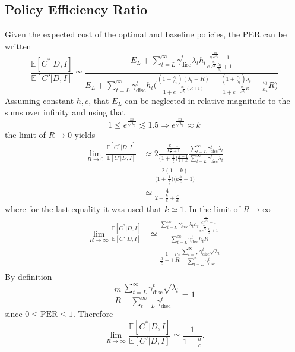 \subsection{Policy Efficiency Ratio}
Given the expected cost of the optimal and baseline policies, the PER can be written
\begin{equation}
	\frac{\mathbb{E}[C^*|D,I] }{\mathbb{E}[C'|D,I]}\simeq \frac{E_L+\sum_{t=L}^{\infty} \gamma_{\text{disc}}^{t} \lambda_th_t\frac{e^{\frac{m}{\sqrt{\lambda_t}}}-1}{e^{\frac{m}{\sqrt{\lambda_t}}}\frac{h_t}{c_t}+1}}{E_L+\sum_{t=L}^{\infty} \gamma_{\text{disc}}^{t}h_t \bigg( 
		\frac{(1+\frac{c_t}{h_t})(\lambda_t+R)}{1+e^{-\frac{m}{\sqrt{\lambda_t}}(R+1)}}- \frac{(1+\frac{c_t}{h_t})\lambda_t}{1+e^{-\frac{m}{\sqrt{\lambda_t}}R}} - \frac{c_t}{h_t}R\bigg)}
\end{equation}
Assuming constant $h,c$, that $E_L$ can be neglected in relative magnitude to the sums over infinity and using that \begin{equation}
	1\leq e^{\frac{m}{\sqrt{\lambda_t}}}\lesssim 1.5 \Rightarrow  e^{\frac{m}{\sqrt{\lambda_t}}}\approx k
\end{equation}
the limit of $R\rightarrow 0$ yields
\begin{equation}
	\begin{split}
		\lim\limits_{R\rightarrow 0}\frac{\mathbb{E}[C^*|D,I]}{\mathbb{E}[C'|D,I]} 
		&\approx 2 \frac{\frac{k-1}{k\frac{h}{c} + 1}}{\big(1 + \frac{1}{\frac{h}{c}}\big)\frac{k-1}{1+k}} \frac{\sum_{t=L}^{\infty} \gamma_{\text{disc}}^{t} \lambda_t}{\sum_{t=L}^{\infty} \gamma_{\text{disc}}^{t} \lambda_t} \\
		&= \frac{2(1+k)}{\big(1 + \frac{1}{\frac{h}{c}}\big)\big(k\frac{h}{c} + 1\big)} \\
		&\simeq \frac{4}{2 + \frac{h}{c} + \frac{c}{h}}
	\end{split}
\end{equation}
where for the last equality it was used that $k\simeq 1$. In the limit of $R\rightarrow \infty$
\begin{equation}
	\begin{split}
		\lim\limits_{R\rightarrow \infty}\frac{\mathbb{E}[C^*|D,I] }{\mathbb{E}[C'|D,I]} &\simeq \frac{\sum_{t=L}^{\infty} \gamma_{\text{disc}}^{t} \lambda_th_t\frac{e^{\frac{m}{\sqrt{\lambda_t}}}-1}{e^{\frac{m}{\sqrt{\lambda_t}}}\frac{h_t}{c_t}+1}}{\sum_{t=L}^{\infty} \gamma_{\text{disc}}^{t}h_t R} \\
		&=\frac{1}{\frac{h}{c}+1} \frac{m}{R}\frac{\sum_{t=L}^{\infty} \gamma_{\text{disc}}^{t} \sqrt{\lambda_t}}{\sum_{t=L}^{\infty} \gamma_{\text{disc}}^{t}} \\
	\end{split}
\end{equation}
By definition
\begin{equation}
	\frac{m}{R}\frac{\sum_{t=L}^{\infty} \gamma_{\text{disc}}^{t} \sqrt{\lambda_t}}{\sum_{t=L}^{\infty} \gamma_{\text{disc}}^{t}} = 1 
\end{equation}
since $0\leq \text{PER}\leq 1$. Therefore
\begin{equation}
		\lim\limits_{R\rightarrow \infty}\frac{\mathbb{E}[C^*|D,I] }{\mathbb{E}[C'|D,I]} \simeq \frac{1}{1+\frac{h}{c}}.
\end{equation}